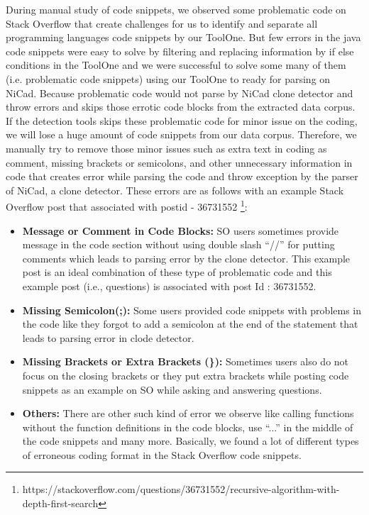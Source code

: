\documentclass[conference]{IEEEtran}
\begin{document}
	During manual study of code snippets, we observed some problematic code on Stack Overflow that create challenges for us to identify and separate all programming languages code snippets by our ToolOne. But few errors in the java code snippets were easy to solve by filtering and replacing information by if else conditions in the ToolOne and we were successful to solve some many of them (i.e. problematic code snippets) using our ToolOne to ready for parsing on NiCad. Because problematic code would not parse by NiCad clone detector and throw errors and skips those errotic code blocks from the extracted data corpus. If the detection tools skips these problematic code for minor issue on the coding, we will lose a huge amount of code snippets from our data corpus. Therefore, we manually try to remove those minor issues such as extra text in coding as comment, missing brackets or semicolons, and other unnecessary information in code that creates error while parsing the code and throw exception by the parser of NiCad, a clone detector.  These errors are as follows with an example Stack Overflow post that associated with postid - 36731552 \footnote{https://stackoverflow.com/questions/36731552/recursive-algorithm-with-depth-first-search}:
	
	\begin{itemize}
		\item \textbf{Message or Comment in Code Blocks:} SO users sometimes provide message in the code section without using double slash “\///” for putting comments which leads to parsing error by the clone detector. This example post is an ideal combination of these type of problematic code and this example post (i.e., questions) is associated with post Id : 36731552.
		\item \textbf{Missing Semicolon(;):} Some users provided code snippets with problems in the code like they forgot to add a semicolon at the end of the statement that leads to parsing error in clode detector.
		\item \textbf{Missing Brackets or Extra Brackets (\}):}  Sometimes users also do not focus on the closing brackets or they put extra brackets while posting code snippets as an example on SO while asking and answering questions.
		\item \textbf{Others:} There are other such kind of error we observe like calling functions without the function definitions in the code blocks, use “...” in the middle of the code snippets and many more. Basically, we found a lot of different types of erroneous coding format in the Stack Overflow code snippets.   
	\end{itemize}
	
\end{document}
